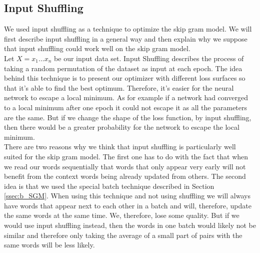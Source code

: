 \documentclass[conference]{IEEEtran}
\begin{document}

\subsection{Input Shuffling}
We used input shuffling as a technique to optimize the skip gram model. We will first describe input shuffling in a general way and then explain why we suppose that input shuffling could work well on the skip gram model. \\
Let $X = {x_1...x_n}$ be our input data set. Input Shuffling describes the process of taking a random permutation of the dataset as input at each epoch.
The idea behind this technique is to present our optimizer with different loss surfaces so that it's able to find the best optimum. Therefore, it's easier for the neural network to escape a local minimum. As for example if a network had converged to a local minimum after one epoch it could not escape it as all the parameters are the same. But if we change the shape of the loss function, by input shuffling, then there would be a greater probability for the network to escape the local minimum.
\\
There are two reasons why we think that input shuffling is particularly well suited for the skip gram model. The first one has to do with the fact that when we read our words sequentially that words that only appear very early will not benefit from the context words being already updated from others. The second idea is that we used the special batch technique described in Section \ref{ssec:b_SGM}. When using this technique and not using shuffling we will always have words that appear next to each other in a batch and will, therefore, update the same words at the same time. We, therefore, lose some quality. But if we would use input shuffling instead, then the words in one batch would likely not be similar and therefore only taking the average of a small part of pairs with the same words will be less likely.
\end{document}
